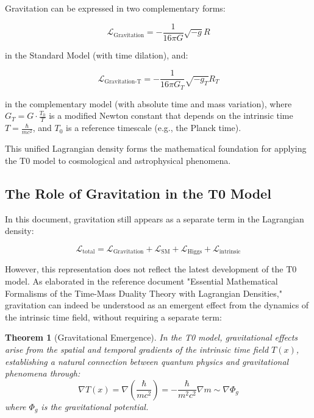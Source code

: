 \documentclass[a4paper,12pt]{article}
\newtheorem{theorem}{Theorem}
\theoremstyle{definition}
\theoremstyle{remark}
\begin{document}
	Gravitation can be expressed in two complementary forms:
	
	\begin{equation}
		\mathcal{L}_\text{Gravitation} = -\frac{1}{16\pi G} \sqrt{-g} R
	\end{equation}
	
	in the Standard Model (with time dilation), and:
	
	\begin{equation}
		\mathcal{L}_\text{Gravitation-T} = -\frac{1}{16\pi G_T} \sqrt{-g_T} R_T
	\end{equation}
	
	in the complementary model (with absolute time and mass variation), where $G_T = G \cdot \frac{T_0}{T}$ is a modified Newton constant that depends on the intrinsic time $T = \frac{\hbar}{mc^2}$, and $T_0$ is a reference timescale (e.g., the Planck time).
	
	This unified Lagrangian density forms the mathematical foundation for applying the T0 model to cosmological and astrophysical phenomena.
	
	\newcommand{\Tfield}{T(x)} %
	
	\subsection{The Role of Gravitation in the T0 Model}
	
	In this document, gravitation still appears as a separate term in the Lagrangian density:
	
	\begin{equation}
		\mathcal{L}_\text{total} = \mathcal{L}_\text{Gravitation} + \mathcal{L}_\text{SM} + \mathcal{L}_\text{Higgs} + \mathcal{L}_\text{intrinsic}
	\end{equation}
	
	However, this representation does not reflect the latest development of the T0 model. As elaborated in the reference document "Essential Mathematical Formalisms of the Time-Mass Duality Theory with Lagrangian Densities," gravitation can indeed be understood as an emergent effect from the dynamics of the intrinsic time field, without requiring a separate term:
	
	\begin{theorem}[Gravitational Emergence]
		In the T0 model, gravitational effects arise from the spatial and temporal gradients of the intrinsic time field $\Tfield$, establishing a natural connection between quantum physics and gravitational phenomena through:
		\begin{equation}
			\nabla \Tfield = \nabla \left(\frac{\hbar}{mc^2}\right) = -\frac{\hbar}{m^2c^2}\nabla m \sim \nabla \Phi_g
		\end{equation}
		where $\Phi_g$ is the gravitational potential.
	\end{theorem}
	
\end{document}
